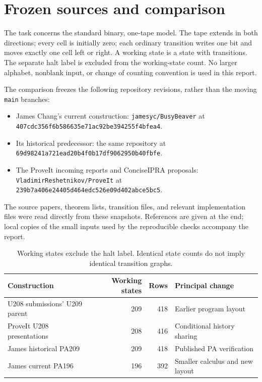 \section{Frozen sources and comparison}
The task concerns the standard binary, one-tape model. The tape extends in both directions; every cell is initially zero; each ordinary transition writes one bit and moves exactly one cell left or right. A working state is a state with transitions. The separate halt label is excluded from the working-state count. No larger alphabet, nonblank input, or change of counting convention is used in this report.

The comparison freezes the following repository revisions, rather than the moving \texttt{main} branches:
\begin{itemize}
\item James Chang's current construction: \texttt{jamesyc/BusyBeaver} at \nolinkurl{407cdc356f6b586635e71ac92be394255f4bfea4}.
\item Its historical predecessor: the same repository at \nolinkurl{69d98241a721ead20b4f0b17df9062950b40fbfe}.
\item The ProveIt incoming reports and ConciseIPRA proposals: \texttt{VladimirReshetnikov/ProveIt} at \nolinkurl{239b7a406e24405d464edc526e09d402abce5bc5}.
\end{itemize}
The source papers, theorem lists, transition files, and relevant implementation files were read directly from these snapshots. References are given at the end; local copies of the small inputs used by the reproducible checks accompany the report.

\begin{table}[ht]
\centering\small
\begin{tabular}{@{}lrrl@{}}
\toprule
Construction & Working states & Rows & Principal change\\
\midrule
U208 submissions' U209 parent &209&418&Earlier program layout\\
ProveIt U208 presentations &208&416&Conditional history sharing\\
James historical PA209 &209&418&Published PA verification\\
James current PA196 &196&392&Smaller calculus and new layout\\
\bottomrule
\end{tabular}
\caption{Working states exclude the halt label. Identical state counts do not imply identical transition graphs.}
\end{table}

